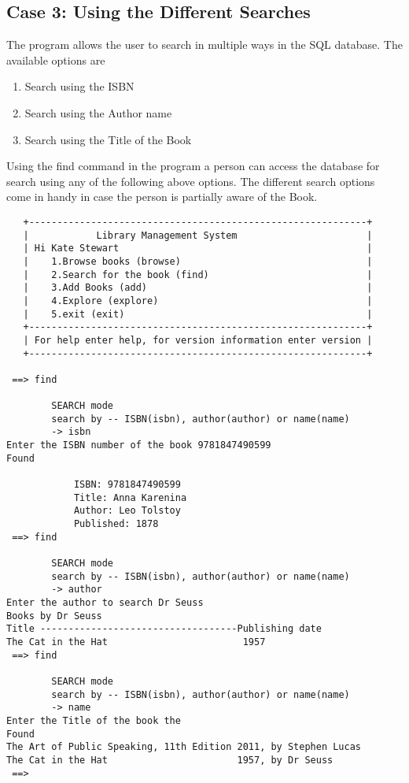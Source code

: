 \documentclass[12pt, a4paper, titlepage, openany]{report}
\begin{document}
\subsection{Case 3: Using the Different Searches}
The program allows the user to search in multiple ways in the SQL database. The available options are 
\begin{enumerate}
\item Search using the ISBN
\item Search using the Author name
\item Search using the Title of the Book
\end{enumerate}

Using the find command in the program a person can access the database for search using any of the following above options. The different search options come in handy in case the person is partially aware of the Book.

\begin{verbatim}
   +------------------------------------------------------------+
   |            Library Management System                       |
   | Hi Kate Stewart                                            |
   |    1.Browse books (browse)                                 |
   |    2.Search for the book (find)                            |
   |    3.Add Books (add)                                       |
   |    4.Explore (explore)                                     |
   |    5.exit (exit)                                           |
   +------------------------------------------------------------+
   | For help enter help, for version information enter version |
   +------------------------------------------------------------+
    
 ==> find

        SEARCH mode
        search by -- ISBN(isbn), author(author) or name(name)
        -> isbn
Enter the ISBN number of the book 9781847490599
Found

            ISBN: 9781847490599
            Title: Anna Karenina
            Author: Leo Tolstoy
            Published: 1878
 ==> find

        SEARCH mode
        search by -- ISBN(isbn), author(author) or name(name)
        -> author
Enter the author to search Dr Seuss
Books by Dr Seuss
Title -----------------------------------Publishing date
The Cat in the Hat                        1957
 ==> find

        SEARCH mode
        search by -- ISBN(isbn), author(author) or name(name)
        -> name
Enter the Title of the book the
Found
The Art of Public Speaking, 11th Edition 2011, by Stephen Lucas
The Cat in the Hat                       1957, by Dr Seuss
 ==> 


\end{verbatim}
\end{document}
